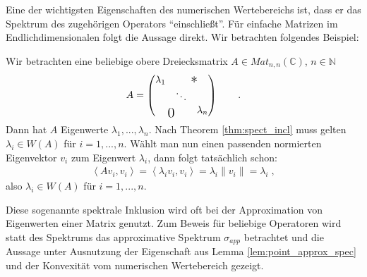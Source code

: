 Eine der wichtigsten Eigenschaften des numerischen Wertebereichs ist, dass er das Spektrum des zugehörigen Operators \enquote{einschließt}. Für einfache Matrizen im Endlichdimensionalen folgt die Aussage direkt. Wir betrachten folgendes Beispiel:

\begin{ex}
	Wir betrachten eine beliebige obere Dreiecksmatrix $A \in \mathit{Mat}_{n,n}(\mathbb{C})$, $n \in \mathbb{N}$
	\begin{align*}
		A = \begin{pmatrix}
			\lambda_1 & \multicolumn{2}{c}{\text{\kern0.5em\smash{\raisebox{-1ex}{\Large *}}}} \\
			& \ddots & \\
			\multicolumn{2}{c}{\text{\smash{\raisebox{-1ex}{\Large 0}}}}& \lambda_n 
		\end{pmatrix} \qquad .
	\end{align*}
	Dann hat $A$ Eigenwerte $\lambda_1, ..., \lambda_n$. Nach Theorem \ref{thm:spect_incl} muss gelten $\lambda_i \in W(A)$ für $i=1,...,n$. Wählt man nun einen passenden normierten Eigenvektor $v_i$ zum Eigenwert $\lambda_i$, dann folgt tatsächlich schon:
	\begin{align}
		\left< Av_i,v_i \right> = \left< \lambda_i v_i,v_i \right> = \lambda_i \|v_i\| = \lambda_i \; ,
	\end{align}
	also $\lambda_i \in W(A)$ für $i=1,...,n$.
\end{ex}

Diese sogenannte spektrale Inklusion wird oft bei der Approximation von Eigenwerten einer Matrix genutzt. Zum Beweis für beliebige Operatoren wird statt des Spektrums das approximative Spektrum $\sigma_{app}$ betrachtet und die Aussage unter Ausnutzung der Eigenschaft aus Lemma \ref{lem:point_approx_spec} und der Konvexität vom numerischen Wertebereich gezeigt. 

